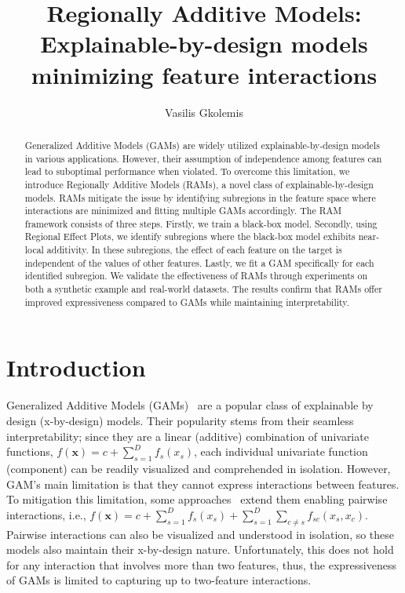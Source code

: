 \documentclass[12pt]{article}
\title{Regionally Additive Models: Explainable-by-design models minimizing feature interactions}
\author{Vasilis Gkolemis}
\newcommand{\xb}{\mathbf{x}}
\begin{document}
    \def\MakeUppercaseUnsupportedInPdfStrings{\scshape}
\maketitle

\begin{abstract}
Generalized Additive Models (GAMs) are widely utilized explainable-by-design models in various applications.
However, their assumption of independence among features can lead to suboptimal performance when violated.
To overcome this limitation, we introduce Regionally Additive Models (RAMs), a novel class of explainable-by-design models.
RAMs mitigate the issue by identifying subregions in the feature space where interactions are minimized and fitting multiple GAMs accordingly.
The RAM framework consists of three steps.
Firstly, we train a black-box model.
Secondly, using Regional Effect Plots, we identify subregions where the black-box model exhibits near-local additivity.
In these subregions, the effect of each feature on the target is independent of the values of other features.
Lastly, we fit a GAM specifically for each identified subregion.
We validate the effectiveness of RAMs through experiments on both a synthetic example and real-world datasets.
The results confirm that RAMs offer improved expressiveness compared to GAMs while maintaining interpretability.
\end{abstract}

\section{Introduction}

Generalized Additive Models (GAMs)~\citep{hastie1987generalized} are a popular class of explainable by design (x-by-design) models.
Their popularity stems from their seamless interpretability; since they are a linear (additive) combination of univariate functions,
\(f(\xb) = c + \sum_{s=1}^D f_s(x_s)\), each individual univariate function (component) can be readily visualized and comprehended in isolation.
However, GAM's main limitation is that they cannot express interactions between features.
To mitigation this limitation, some approaches~\citep{lou2013accurate} extend them enabling pairwise interactions,
i.e., \(f(\xb) = c + \sum_{s=1}^D f_s(x_s) + \sum_{s=1}^D \sum_{c \neq s} f_{sc}(x_s, x_c)\).
Pairwise interactions can also be visualized and understood in isolation, so these models also maintain their x-by-design nature.
Unfortunately, this does not hold for any interaction that involves more than two features, thus, the expressiveness of GAMs is limited to capturing up to two-feature interactions.
\end{document}
